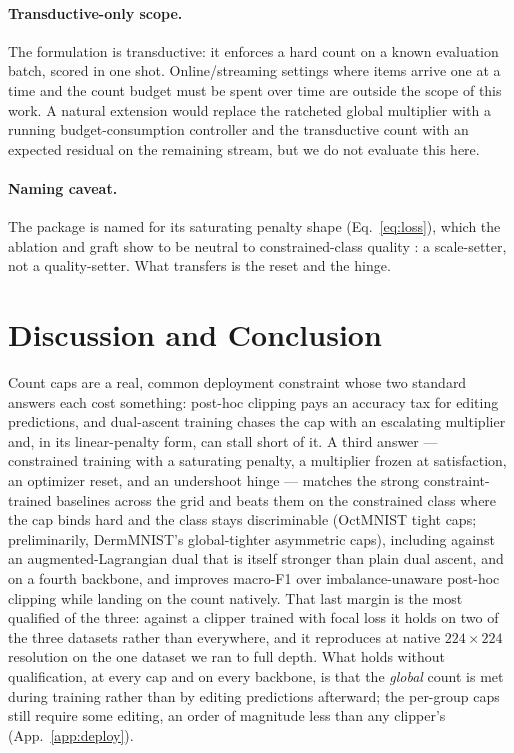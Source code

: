 \documentclass[10pt]{article}
\begin{document}
\paragraph{Transductive-only scope.}
The formulation is transductive: it enforces a hard count on a known
evaluation batch, scored in one shot. Online/streaming settings where
items arrive one at a time and the count budget must be spent over time
are outside the scope of this work. A natural extension would replace
the ratcheted global multiplier with a running budget-consumption
controller and the transductive count with an expected residual on the
remaining stream, but we do not evaluate this here.

\paragraph{Naming caveat.}
The package is named for its saturating penalty shape
(Eq.~\eqref{eq:loss}), which the ablation and graft show to be neutral to
constrained-class quality%
{: a scale-setter, not a quality-setter. What transfers is the
reset and the hinge.}

\section{Discussion and Conclusion}
\label{sec:conclusion}

Count caps are a real, common deployment constraint whose two standard
answers each cost something: post-hoc clipping pays an accuracy tax for
editing predictions, and dual-ascent training chases the cap with an
escalating multiplier and, in its linear-penalty form, can stall short of
it. A third answer --- constrained training with a saturating penalty, a
multiplier frozen at satisfaction, an optimizer reset, and an undershoot
hinge --- matches the strong constraint-trained baselines across the grid
and beats them on the constrained class where the cap binds hard and the
class stays discriminable (OctMNIST tight caps; preliminarily,
DermMNIST's global-tighter asymmetric caps),{ including against an
augmented-Lagrangian dual that is itself stronger than plain dual ascent, and on a
fourth backbone,} and improves macro-F1 over
{ imbalance-unaware post-hoc clipping}
while landing on the count natively.{ That last margin is the most
qualified of the three: against a clipper trained with focal loss it holds on two of the
three datasets rather than everywhere, and it reproduces at native
$224{\times}224$ resolution on the one dataset we ran to full depth. What holds
without qualification, at every cap and on every backbone, is that the
{\emph{global}} count is met
during training rather than by editing predictions afterward{; the
per-group caps still require some editing, an order of magnitude less than any
clipper's (App.~\ref{app:deploy})}.}
\end{document}
